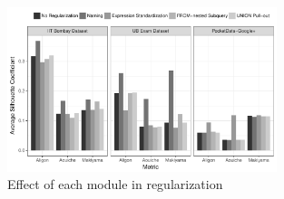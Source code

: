 
\begin{figure}[h!]
    \vspace*{-2mm}
    \centering
    \includegraphics[width=0.70\textwidth]{TKDE-QuerySimilarity/graphics/module}%
	\caption{Effect of each module in regularization}
    \label{fig:module}
\end{figure}

